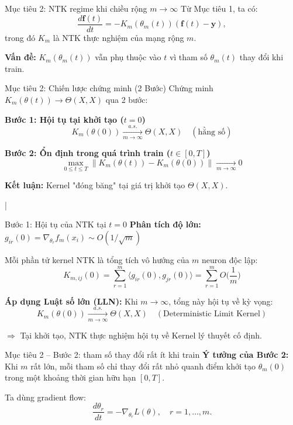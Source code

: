 \begin{frame}{Mục tiêu 2: NTK regime khi chiều rộng $m \to \infty$}
  Từ Mục tiêu 1, ta có:
  \[
    \frac{d\mathbf f(t)}{dt}
    = -K_m(\theta_m(t))(\mathbf f(t) - \mathbf y),
  \]
  trong đó $K_m$ là NTK thực nghiệm của mạng rộng $m$.

  \vspace{0.2cm}
  \textbf{Vấn đề:} $K_m(\theta_m(t))$ vẫn phụ thuộc vào $t$
  vì tham số $\theta_m(t)$ thay đổi khi train.
\end{frame}

\begin{frame}{Mục tiêu 2: Chiến lược chứng minh (2 Bước)}
  Chứng minh $K_m(\theta(t)) \to \Theta(X,X)$ qua 2 bước:

  \vspace{0.3cm}
  \textbf{Bước 1: Hội tụ tại khởi tạo ($t=0$)}
  \[
    K_m(\theta(0)) \xrightarrow[m\to\infty]{a.s.} \Theta(X,X) \quad (\text{hằng số})
  \]

  \vspace{0.3cm}
  \textbf{Bước 2: Ổn định trong quá trình train ($t \in [0, T]$)}
  \[
    \max_{0 \le t \le T} \|K_m(\theta(t)) - K_m(\theta(0))\| \xrightarrow[m\to\infty]{} 0
  \]

  \vspace{0.3cm}
  \textbf{Kết luận:} Kernel "đóng băng" tại giá trị khởi tạo $\Theta(X,X)$.
\end{frame}

|

\begin{frame}{Bước 1: Hội tụ của NTK tại $t=0$}
  \textbf{Phân tích độ lớn:} $g_{ir}(0) = \nabla_{\theta_r} f_m(x_i) \sim O(1/\sqrt{m})$
  
  Mỗi phần tử kernel NTK là tổng tích vô hướng của $m$ neuron độc lập:
  \[
    K_{m,ij}(0) = \sum_{r=1}^m \langle g_{ir}(0), g_{jr}(0) \rangle = \sum_{r=1}^m O\Big(\frac{1}{m}\Big)
  \]
  
  \textbf{Áp dụng Luật số lớn (LLN):} Khi $m \to \infty$, tổng này hội tụ về kỳ vọng:
  \[
    K_m(\theta(0)) \xrightarrow[m\to\infty]{a.s.} \Theta(X,X) \quad (\text{Deterministic Limit Kernel})
  \]

  $\Rightarrow$ Tại khởi tạo, NTK thực nghiệm hội tụ về Kernel lý thuyết cố định.
\end{frame}

\begin{frame}{Mục tiêu 2 – Bước 2: tham số thay đổi rất ít khi train}
  \textbf{Ý tưởng của Bước 2:}  
  Khi $m$ rất lớn, mỗi tham số chỉ thay đổi rất nhỏ quanh điểm khởi tạo
  $\theta_m(0)$ trong một khoảng thời gian hữu hạn $[0,T]$.

  \vspace{0.2cm}
  Ta dùng gradient flow:
  \[
    \frac{d\theta_r}{dt}
    = -\nabla_{\theta_r}L(\theta),
    \quad r = 1,\dots,m.
  \]
\end{frame}


